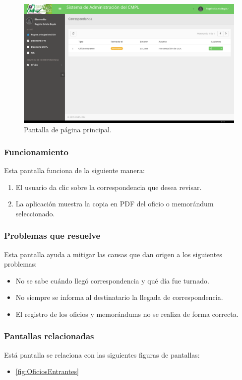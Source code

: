 	\begin{figure}[htbp!]
		\centering
			\includegraphics[width=1\textwidth]{Pantallas/PaginaPrincipal.png}
		\caption{Pantalla de página principal.}
		\label{fig:HomePage}
	\end{figure}

\subsubsection{Funcionamiento}
	Esta pantalla funciona de la siguiente manera:
	
	\begin{enumerate}
		\item El usuario da clic sobre la correspondencia que desea revisar.
		\item La aplicación muestra la copia en PDF del oficio o memorándum seleccionado.
	\end{enumerate}

\subsubsection{Problemas que resuelve}
Esta pantalla ayuda a mitigar las causas que dan origen a los siguientes problemas:

	\begin{itemize}
		\item No se sabe cuándo llegó correspondencia y qué día fue turnado.
		\item No siempre se informa al destinatario la llegada de correspondencia.
		\item El registro de los oficios y memorándums no se realiza de forma correcta.
	\end{itemize}

\subsubsection{Pantallas relacionadas}
Está pantalla se relaciona con las siguientes figuras de pantallas:
	\begin{itemize}
		\item \ref{fig:OficiosEntrantes}
	\end{itemize}

